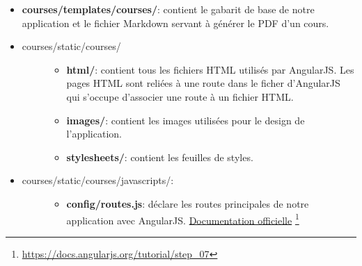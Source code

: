 \documentclass[letterpaper,10pt,oneside]{sphinxmanual}
\begin{document}
\begin{itemize}
\begin{description}
\begin{itemize}
\item {} 
\textbf{utils.py}: regroupe une série de fonctions utiles utilisées à travers l'application.

\item {} 
\textbf{views.py}: contient les vues Django. A l'instar des URL, il n'y a que deux fonctions, une qui est le point de départ de l'application et l'autre qui génère le PDF d'un cours. \href{https://docs.djangoproject.com/fr/1.7/topics/http/views/}{Documentation officielle} \footnote{
\href{https://docs.djangoproject.com/fr/1.7/topics/http/views/}{https://docs.djangoproject.com/fr/1.7/topics/http/views/}
}

\end{itemize}

\end{description}

\item {} 
\textbf{courses/templates/courses/}: contient le gabarit de base  de notre application et le fichier Markdown  servant à générer le PDF d'un cours.

\item {} \begin{description}
\item[{courses/static/courses/}] \leavevmode\begin{itemize}
\item {} 
\textbf{html/}: contient tous les fichiers HTML utilisés par AngularJS. Les pages HTML sont reliées à une route dans le ficher  d'AngularJS qui s'occupe d'associer une route à un fichier HTML.

\item {} 
\textbf{images/}: contient les images utilisées pour le design de l'application.

\item {} 
\textbf{stylesheets/}: contient les feuilles de styles.

\end{itemize}

\end{description}

\item {} \begin{description}
\item[{courses/static/courses/javascripts/:}] \leavevmode\begin{itemize}
\item {} 
\textbf{config/routes.js}: déclare les routes principales de notre application avec AngularJS. \href{https://docs.angularjs.org/tutorial/step\_07}{Documentation officielle} \footnote{
\href{https://docs.angularjs.org/tutorial/step\_07}{https://docs.angularjs.org/tutorial/step\_07}
}


\end{itemize}
\end{description}
\end{itemize}
\end{document}
